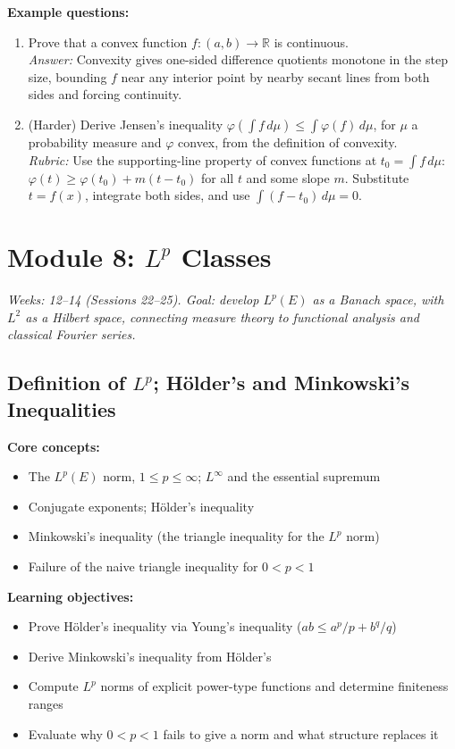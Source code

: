 \documentclass[11pt]{article}
\begin{document}
\textbf{Example questions:}
\begin{enumerate}[nosep]
\item Prove that a convex function $f:(a,b)\to\mathbb{R}$ is continuous. \\
\textit{Answer:} Convexity gives one-sided difference quotients monotone in the step size, bounding $f$ near any interior point by nearby secant lines from both sides and forcing continuity.
\item (Harder) Derive Jensen's inequality $\varphi\!\left(\int f\,d\mu\right)\le\int\varphi(f)\,d\mu$, for $\mu$ a probability measure and $\varphi$ convex, from the definition of convexity. \\
\textit{Rubric:} Use the supporting-line property of convex functions at $t_0=\int f\,d\mu$: $\varphi(t)\ge\varphi(t_0)+m(t-t_0)$ for all $t$ and some slope $m$. Substitute $t=f(x)$, integrate both sides, and use $\int(f-t_0)\,d\mu=0$.
\end{enumerate}

\section{Module 8: $L^p$ Classes}
\textit{Weeks: 12--14 (Sessions 22--25). Goal: develop $L^p(E)$ as a Banach space, with $L^2$ as a Hilbert space, connecting measure theory to functional analysis and classical Fourier series.}

\subsection{Definition of $L^p$; H\"older's and Minkowski's Inequalities}

\textbf{Core concepts:}
\begin{itemize}[nosep]
\item The $L^p(E)$ norm, $1\le p\le\infty$; $L^\infty$ and the essential supremum
\item Conjugate exponents; H\"older's inequality
\item Minkowski's inequality (the triangle inequality for the $L^p$ norm)
\item Failure of the naive triangle inequality for $0<p<1$
\end{itemize}

\textbf{Learning objectives:}
\begin{itemize}[nosep]
\item Prove H\"older's inequality via Young's inequality ($ab\le a^p/p+b^q/q$)
\item Derive Minkowski's inequality from H\"older's
\item Compute $L^p$ norms of explicit power-type functions and determine finiteness ranges
\item Evaluate why $0<p<1$ fails to give a norm and what structure replaces it
\end{itemize}
\end{document}

